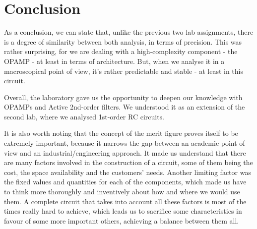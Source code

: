 \section{Conclusion}
\label{sec:conclusion}

As a conclusion, we can state that, unlike the previous two lab assignments, there is a degree of similarity between both analysis, in terms of precision. This was rather surprising, for we are dealing with a high-complexity component - the OPAMP - at least in terms of architecture. But, when we analyse it in a macroscopical point of view, it's rather predictable and stable - at least in this circuit. 

Overall, the laboratory gave us the opportunity to deepen our knowledge with OPAMPs and Active 2nd-order filters. We understood it as an extension of the second lab, where we analysed 1st-order RC circuits. 

It is also worth noting that the concept of the merit figure proves itself to be extremely important, because it narrows the gap between an academic point of view and an industrial/engineering approach. It made us understand that there are many factors involved in the construction of a circuit, some of them being the cost, the space availability and the customers' needs. Another limiting factor was the fixed values and quantities for each of the components, which made us have to think more thoroughly and inventively about how and where we would use them. A complete circuit that takes into account all these factors is most of the times really hard to achieve, which leads us to sacrifice some characteristics in favour of some more important others, achieving a balance between them all.

